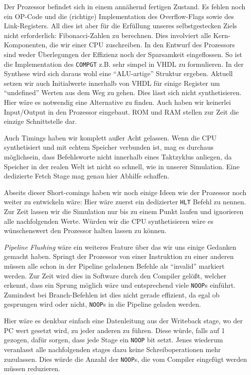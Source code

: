 \documentclass[paper=a4,fontsize=11pt,twocolumn]{scrreprt}
\begin{document}
Der Prozessor befindet sich in einem annähernd fertigen Zustand.
Es fehlen noch ein OP-Code und die (richtige) Implementation des Overflow-Flags sowie des Link-Registers.
All dies ist aber für die Erfüllung unseres selbstgestecken Ziels nicht erforderlich: Fibonacci-Zahlen zu berechnen.
Dies involviert alle Kern-Komponenten, die wir einer CPU zuschreiben.
In den Entwurf des Prozessors sind weder Überlegungen der Effizienz noch der Sparsamkeit eingeflossen.
So ist die Implementation des \texttt{COMPGT} z.B. sehr simpel in VHDL zu formulieren.
In der Synthese wird sich daraus wohl eine \enquote{ALU-artige} Struktur ergeben.
Aktuell setzen wir auch Initialwerte innerhalb von VHDL für einige Register um \enquote{undefined} Werten aus dem Weg zu gehen.
Dies lässt sich nicht synthetisieren.
Hier wäre es notwendig eine Alternative zu finden.
Auch haben wir keinerlei Input/Output in den Prozessor eingebaut.
ROM und RAM stellen zur Zeit die einzige Schnittstelle dar.

Auch Timings haben wir komplett außer Acht gelassen.
Wenn die CPU synthetisiert und mit echtem Speicher verbunden ist, mag es durchaus möglich\footnotemark sein, dass Befehlsworte nicht innerhalb eines Taktzyklus anliegen, da Speicher in der realen Welt ist nicht so schnell, wie in unserer Simulation.
Eine dedizierte Fetch Stage mag genau hier Abhilfe schaffen.

Abseits dieser Short-comings haben wir noch einige Ideen wie der Prozessor noch weiter zu entwickeln wäre:
Hier wäre zuerst ein dedizierter \texttt{HLT} Befehl zu nennen.
Zur Zeit lassen wir die Simulation nur bis zu einem Punkt laufen und ignorieren alle nachfolgenden Werte.
Würden wir die CPU synthetisieren wäre es wünschenswert den Prozessor halten lassen zu können.

\textit{Pipeline Flushing} wäre ein weiteres Feature über das wir uns einige Gedanken gemacht haben.
Springt der Prozessor von einer Instruktion zu einer anderen müssen alle schon in der Pipeline geladenen Befehle als \enquote{invalid} markiert werden.
Zur Zeit wird dies in Software durch den Compiler gelößt, welcher erkennt, dass ein Sprung möglich wäre und entsprechend viele \texttt{NOOP}s einführt.
Zumindest bei Branch-Befehlen ist dies nicht gerade effizient, da egal ob gesprungen wird oder nicht, \texttt{NOOP}s in die Pipeline geladen werden.

Hier wäre es denkbar einfach eine Datenleitung aus der Writeback stage, wo der PC wert gesetzt wird, zu jeder anderen zu führen.
Diese würde, falls auf 1 gezogen, dafür sorgen, dass jede Stage ein \texttt{NOOP} bit setzt.
Jenes wiederum veranlasst alle nachfolgenden stages dazu keine Schreiboperationen mehr zuzulassen.
Dies würde die Anzahl der \texttt{NOOP}s, die vom Compiler eingefügt werden müssen reduzieren.
\end{document}
